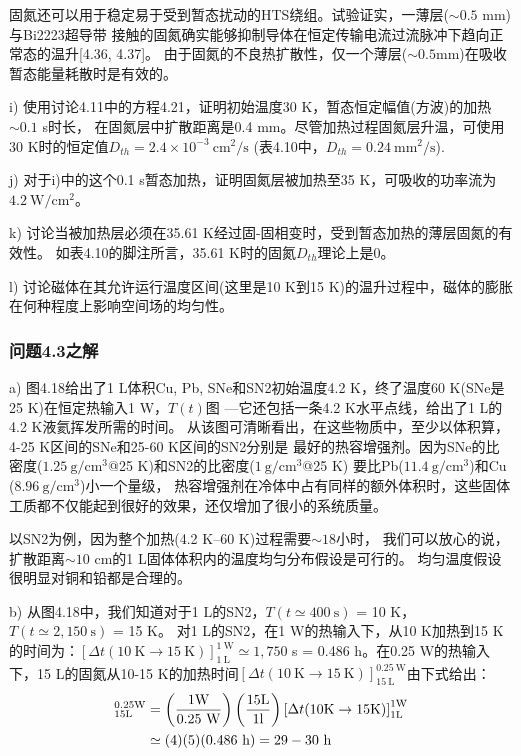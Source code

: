 固氮还可以用于稳定易于受到暂态扰动的HTS绕组。试验证实，一薄层($\sim 0.5$ mm)与Bi2223超导带
接触的固氮确实能够抑制导体在恒定传输电流过流脉冲下趋向正常态的温升[4.36, 4.37]。
由于固氮的不良热扩散性，仅一个薄层($\sim 0.5$mm)在吸收暂态能量耗散时是有效的。

i) 使用讨论4.11中的方程4.21，证明初始温度30 K，暂态恒定幅值(方波)的加热$\sim 0.1$ s时长，
在固氮层中扩散距离是0.4 mm。尽管加热过程固氮层升温，可使用30 K时的恒定值$D_{th}=2.4×10^{−3}\ \mathrm{cm^2/s}$ (表4.10中，$D_{th}=0.24\ \mathrm{mm^2/s}$).


j) 对于i)中的这个0.1 s暂态加热，证明固氮层被加热至35 K，可吸收的功率流为$4.2\ \mathrm{W/cm^2}$。

k) 讨论当被加热层必须在35.61 K经过固-固相变时，受到暂态加热的薄层固氮的有效性。
如表4.10的脚注所言，35.61 K时的固氮$D_{th}$理论上是0。

l) 讨论磁体在其允许运行温度区间(这里是10 K到15 K)的温升过程中，磁体的膨胀在何种程度上影响空间场的均匀性。

\subsubsection{问题4.3之解}
a) 图4.18给出了1 L体积Cu, Pb, SNe和SN2初始温度4.2 K，终了温度60 K(SNe是25 K)在恒定热输入1 W，$T(t)$图
---它还包括一条4.2 K水平点线，给出了1 L的4.2 K液氦挥发所需的时间。
从该图可清晰看出，在这些物质中，至少以体积算，4-25 K区间的SNe和25-60 K区间的SN2分别是
最好的热容增强剂。因为SNe的比密度($1.25\ \mathrm{g/cm^3}$@25 K)和SN2的比密度($1\ \mathrm{g/cm^3}$@25 K)
要比Pb($11.4\ \mathrm{g/cm^3}$)和Cu ($8.96\ \mathrm{g/cm^3}$)小一个量级，
热容增强剂在冷体中占有同样的额外体积时，这些固体工质都不仅能起到很好的效果，还仅增加了很小的系统质量。

以SN2为例，因为整个加热(4.2 K–60 K)过程需要$\sim 18$小时，
我们可以放心的说，扩散距离$\sim 10$ cm的1 L固体体积内的温度均匀分布假设是可行的。
均匀温度假设很明显对铜和铅都是合理的。

b) 从图4.18中，我们知道对于1 L的SN2，$T(t\simeq 400\ \mathrm{s})$ = 10 K，$T(t\simeq 2,150\ \mathrm{s})$ = 15 K。
对1 L的SN2，在1 W的热输入下，从10 K加热到15 K的时间为：$[\Delta t(10 \ \mathrm{K}\rightarrow 15\ \mathrm{K})]_{1\ \mathrm{L}}^{1\ \mathrm{W}}\simeq 1,750$ s = 0.486 h。在0.25 W的热输入下，15 L的固氮从10-15 K的加热时间$[\Delta t(10 \ \mathrm{K}\rightarrow 15 \ \mathrm{K})]_{15 \ \mathrm{L}}^{0.25\ \mathrm{W}}$由下式给出：
\begin{align*}%
[\Delta t(10\mathrm{K}\rightarrow 15\ \mathrm{K})]_{15\mathrm{L}}^{0.25\mathrm{W}}&=\left(\frac{1\mathrm{W}}{0.25\ \mathrm{W}}\right)\left(\frac{15\mathrm{L}}{1\mathrm{l}}\right)\left[\Delta t(10\mathrm{K}\rightarrow 15\mathrm{K})\right]_{1\mathrm{L}}^{1\mathrm{W}}\\\notag
&\simeq (4)(5)(0.486\ \mathrm{h})=29-30\ \mathrm{h}
\end{align*}

